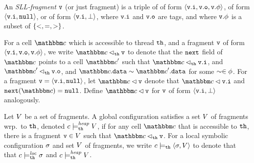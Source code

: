 \begin{definition}
\label{def:sll-fragment}
An {\em SLL-fragment} $\mathtt{v}$ (or just fragment)
is a triple of of form
$\left\langle\mathtt{v}.\mathtt{i},\mathtt{v}.\mathtt{o},\mathtt{v}.\phi\right\rangle$, of form
$\left\langle\mathtt{v}.\mathtt{i},{\tt null}\right\rangle$, or of form
$\left\langle\mathtt{v}.\mathtt{i},\bot\right\rangle$,
where $\mathtt{v}.\mathtt{i}$ and $\mathtt{v}.\mathtt{o}$ are tags,
    and where $\mathtt{v}.\phi$ is a subset of $\left\{<, =, >\right\}$.
\end{definition}

For a cell $\cell$ which is accessible to thread ${\tt th}$, and a fragment
$\mathtt{v}$ of form $\left\langle\mathtt{v}.\mathtt{i},\mathtt{v}.\mathtt{o},\mathtt{v}.\phi\right\rangle$, we write $\cell \satfrag{\thread}\frag$ to denote that
the ${\tt next}$ field of $\cell$ points to a cell $\cell'$ such that
$\cell \satfrag{\thread} \inat{\frag}$, and
$\cell' \satfrag{\thread} \outat{\frag}$, and
$\cell.\mathtt{data} \sim \cell'.\mathtt{data}$ for some $\sim \in \phi$.
For a fragment $\mathtt{v} = \left\langle\mathtt{v}.\mathtt{i},{\tt null}\right\rangle$, let
$\cell \lhd \frag$ denote that
$\cell \lhd \inat{\frag}$ and $\mathtt{next}(\cell) = \nullconst$.
Define $\cell \lhd \frag$ for $\mathtt{v}$ of form $\left\langle\mathtt{v}.\mathtt{i},\bot\right\rangle$
analogously.

Let $V$ be a set of fragments.
A global configuration satisfies a set $V$ of fragments wrp.\ to ${\tt th}$,
denoted  $c \models_{{\tt th}}^{\mathit{heap}} V$,
if
for any cell $\cell$ that is accessible to ${\tt th}$, there is a fragment
$\mathtt{v} \in V$ such that $\cell \satfrag{{\thread}} \frag$.
For a local symbolic  configuration $\sigma$ and set $V$ of
fragments, we write
$c \models_{{\tt th}} \left\langle\sigma,V\right\rangle$ to denote that
that $c \models_{{\tt th}}^{\mathit{loc}} \sigma$
and $c \models_{{\tt th}}^{\mathit{heap}} V$.


